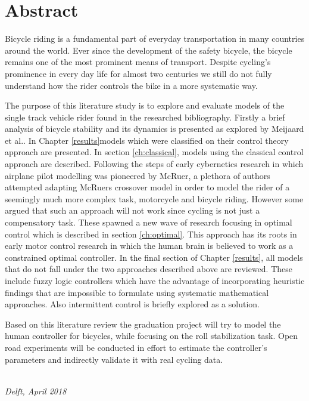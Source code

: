 \chapter*{Abstract}\label{chap:abstract}

Bicycle riding is a fundamental part of everyday transportation in many countries around the world. Ever since the development of the safety bicycle, the bicycle remains  one of the most prominent means of transport. Despite cycling’s prominence in every day life for almost two centuries we still do not fully understand how the rider controls the bike in a more systematic way.

The purpose of this literature study is to explore and evaluate models of the single track vehicle rider found in the researched bibliography. Firstly a brief analysis of bicycle stability and its dynamics is presented as explored by Meijaard et al.\cite{meijaard2007linearized}. In Chapter \ref{results}models which were classified on their control theory approach are presented. In section \ref{ch:classical}, models using the classical control approach are described. Following the steps of early cybernetics research in which airplane pilot modelling was pioneered by McRuer\cite{mcruer1959human,mcruer1967manual,mcruer1967manual2}, a plethora of authors attempted adapting McRuers crossover model in order to model the rider of a seemingly much more complex task, motorcycle and bicycle riding. However some argued that such an approach will not work since cycling is not just a compensatory task. These spawned a new wave of research focusing in optimal control which is described in section \ref{ch:optimal}.  This approach has its roots in early motor control research in which the human brain is believed to work as a constrained optimal controller. In the final section of Chapter \ref{results}, all models that do not fall under the two approaches described above are reviewed. These include fuzzy logic controllers which have the advantage of incorporating heuristic  findings that are impossible to formulate using systematic mathematical approaches. Also intermittent control is briefly explored as a solution. 

Based on this literature review the graduation project will try to model the human controller for bicycles, while focusing  on the roll stabilization task. Open road experiments will be conducted in effort to estimate the controller’s parameters and indirectly validate it with real cycling data.



\begin{flushright}
{\makeatletter\itshape
    \@author \\
    Delft, April 2018
\makeatother}
\end{flushright}
